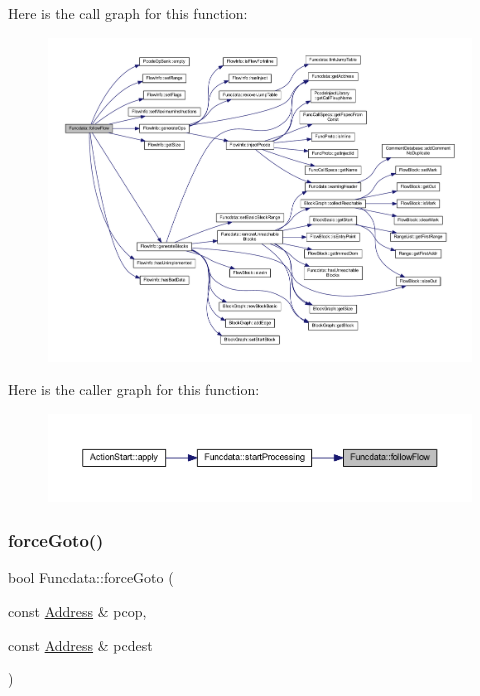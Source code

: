 Here is the call graph for this function\+:
\nopagebreak
\begin{figure}[H]
\begin{center}
\leavevmode
\includegraphics[width=350pt]{class_funcdata_a91b3b1d1d751868c394eda804afa0bc8_cgraph}
\end{center}
\end{figure}
Here is the caller graph for this function\+:
\nopagebreak
\begin{figure}[H]
\begin{center}
\leavevmode
\includegraphics[width=350pt]{class_funcdata_a91b3b1d1d751868c394eda804afa0bc8_icgraph}
\end{center}
\end{figure}
\mbox{\label{class_funcdata_ac9b35091642dc7527a537d01db5ad7e1}} 
\subsubsection{\texorpdfstring{forceGoto()}{forceGoto()}}
{\footnotesize\ttfamily bool Funcdata\+::force\+Goto (\begin{DoxyParamCaption}\item[{const \mbox{\hyperlink{class_address}{Address}} \&}]{pcop,  }\item[{const \mbox{\hyperlink{class_address}{Address}} \&}]{pcdest }\end{DoxyParamCaption})}



